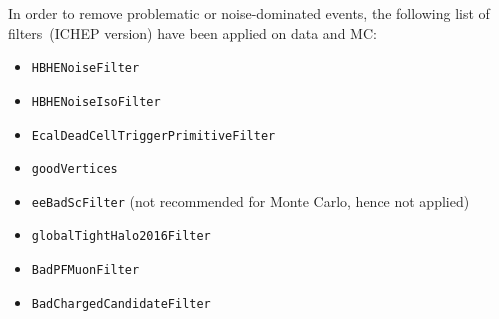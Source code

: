 

In order to remove problematic or noise-dominated events, the following list of filters~\cite{JMETPOG_filt}(ICHEP version) have been applied on data and MC:

\begin{itemize}
  \item {\tt HBHENoiseFilter}
  \item {\tt HBHENoiseIsoFilter}
  \item {\tt EcalDeadCellTriggerPrimitiveFilter}
  \item {\tt goodVertices}
  \item {\tt eeBadScFilter} (not recommended for Monte Carlo, hence not applied)
  \item {\tt globalTightHalo2016Filter}
    \item {\tt BadPFMuonFilter}
    \item {\tt BadChargedCandidateFilter}
\end{itemize}

